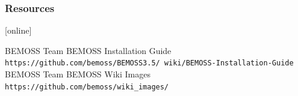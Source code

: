 \documentclass{beamer}
\begin{document}

\begin{frame}[allowframebreaks]
  \frametitle<presentation>{Resources}
    
  \begin{thebibliography}{10}
    
  [online]
  
    BEMOSS Team
    \newblock BEMOSS Installation Guide
    \newblock \texttt{https://github.com/bemoss/BEMOSS3.5/
    wiki/BEMOSS-Installation-Guide
   } 
  	BEMOSS Team
  	\newblock BEMOSS Wiki Images
  	\newblock \texttt{https://github.com/bemoss/wiki\_images/}
 
  \end{thebibliography}
\end{frame}
\end{document}
